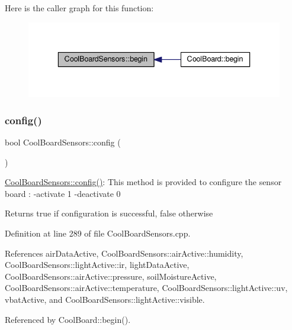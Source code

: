 Here is the caller graph for this function\+:\nopagebreak
\begin{figure}[H]
\begin{center}
\leavevmode
\includegraphics[width=336pt]{classCoolBoardSensors_a97095823ef7c8f5290812f1405b966b3_icgraph}
\end{center}
\end{figure}
\mbox{\label{classCoolBoardSensors_a9a218895c5423375c33c08f2c56fb23a}} 
\subsubsection{\texorpdfstring{config()}{config()}}
{\footnotesize\ttfamily bool Cool\+Board\+Sensors\+::config (\begin{DoxyParamCaption}{ }\end{DoxyParamCaption})}

\hyperlink{classCoolBoardSensors_a9a218895c5423375c33c08f2c56fb23a}{Cool\+Board\+Sensors\+::config()}\+: This method is provided to configure the sensor board \+: -\/activate 1 -\/deactivate 0

\begin{DoxyReturn}{Returns}
true if configuration is successful, false otherwise 
\end{DoxyReturn}


Definition at line 289 of file Cool\+Board\+Sensors.\+cpp.



References air\+Data\+Active, Cool\+Board\+Sensors\+::air\+Active\+::humidity, Cool\+Board\+Sensors\+::light\+Active\+::ir, light\+Data\+Active, Cool\+Board\+Sensors\+::air\+Active\+::pressure, soil\+Moisture\+Active, Cool\+Board\+Sensors\+::air\+Active\+::temperature, Cool\+Board\+Sensors\+::light\+Active\+::uv, vbat\+Active, and Cool\+Board\+Sensors\+::light\+Active\+::visible.



Referenced by Cool\+Board\+::begin().


